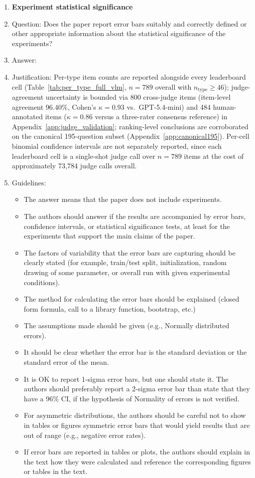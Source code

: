 \documentclass{article}
\begin{document}
\begin{enumerate}
\item {\bf Experiment statistical significance}
    \item[] Question: Does the paper report error bars suitably and correctly defined or other appropriate information about the statistical significance of the experiments?
    \item[] Answer: \answerYes{}
    \item[] Justification: Per-type item counts are reported alongside every leaderboard cell (Table~\ref{tab:per_type_full_vlm}, $n=789$ overall with $n_{\text{type}} \geq 46$); judge-agreement uncertainty is bounded via 800 cross-judge items (item-level agreement 96.40\%, Cohen's $\kappa = 0.93$ vs.\ GPT-5.4-mini) and 484 human-annotated items ($\kappa = 0.86$ versus a three-rater consensus reference) in Appendix~\ref{app:judge_validation}; ranking-level conclusions are corroborated on the canonical 195-question subset (Appendix~\ref{app:canonical195}). Per-cell binomial confidence intervals are not separately reported, since each leaderboard cell is a single-shot judge call over $n=789$ items at the cost of approximately 73{,}784 judge calls overall.
    \item[] Guidelines:
    \begin{itemize}
        \item The answer \answerNA{} means that the paper does not include experiments.
        \item The authors should answer \answerYes{} if the results are accompanied by error bars, confidence intervals, or statistical significance tests, at least for the experiments that support the main claims of the paper.
        \item The factors of variability that the error bars are capturing should be clearly stated (for example, train/test split, initialization, random drawing of some parameter, or overall run with given experimental conditions).
        \item The method for calculating the error bars should be explained (closed form formula, call to a library function, bootstrap, etc.)
        \item The assumptions made should be given (e.g., Normally distributed errors).
        \item It should be clear whether the error bar is the standard deviation or the standard error of the mean.
        \item It is OK to report 1-sigma error bars, but one should state it. The authors should preferably report a 2-sigma error bar than state that they have a 96\% CI, if the hypothesis of Normality of errors is not verified.
        \item For asymmetric distributions, the authors should be careful not to show in tables or figures symmetric error bars that would yield results that are out of range (e.g., negative error rates).
        \item If error bars are reported in tables or plots, the authors should explain in the text how they were calculated and reference the corresponding figures or tables in the text.
    \end{itemize}


\end{enumerate}
\end{document}
